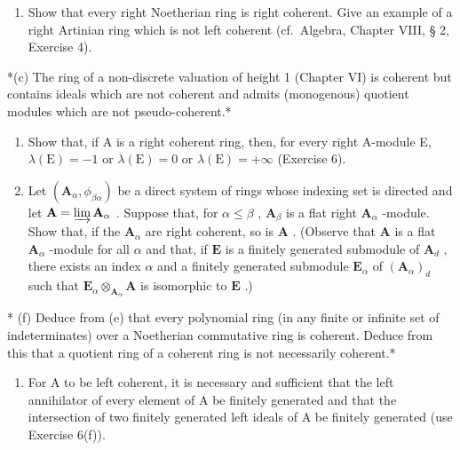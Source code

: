 \begin{enumerate}
\def\labelenumi{(\alph{enumi})}
\setcounter{enumi}{1}
\tightlist
\item
  Show that every right Noetherian ring is right coherent. Give an example of a right Artinian ring which is not left coherent (cf.~Algebra, Chapter VIII, § 2, Exercise 4).
\end{enumerate}

*(c) The ring of a non-discrete valuation of height 1 (Chapter VI) is coherent but contains ideals which are not coherent and admits (monogenous) quotient modules which are not pseudo-coherent.*

\begin{enumerate}
\def\labelenumi{(\alph{enumi})}
\setcounter{enumi}{3}
\item
  Show that, if A is a right coherent ring, then, for every right A-module E, \(\lambda(\mathrm{E}) = -1\) or \(\lambda(\mathrm{E}) = 0\) or \(\lambda(\mathrm{E}) = +\infty\) (Exercise 6).
\item
  Let \((\mathbf{A}_{\alpha}, \phi_{\beta \alpha})\) be a direct system of rings whose indexing set is directed and let \(\mathbf{A} = \varinjlim \mathbf{A}_{\alpha}\) . Suppose that, for \(\alpha \leqslant \beta\) , \(\mathbf{A}_{\beta}\) is a flat right \(\mathbf{A}_{\alpha}\) -module. Show that, if the \(\mathbf{A}_{\alpha}\) are right coherent, so is \(\mathbf{A}\) . (Observe that \(\mathbf{A}\) is a flat \(\mathbf{A}_{\alpha}\) -module for all \(\alpha\) and that, if \(\mathbf{E}\) is a finitely generated submodule of \(\mathbf{A}_d\) , there exists an index \(\alpha\) and a finitely generated submodule \(\mathbf{E}_{\alpha}\) of \((\mathbf{A}_{\alpha})_d\) such that \(\mathbf{E}_{\alpha} \otimes_{\mathbf{A}_{\alpha}} \mathbf{A}\) is isomorphic to \(\mathbf{E}\) .)
\end{enumerate}

* (f) Deduce from (e) that every polynomial ring (in any finite or infinite set of indeterminates) over a Noetherian commutative ring is coherent. Deduce from this that a quotient ring of a coherent ring is not necessarily coherent.*

\begin{enumerate}
\def\labelenumi{(\alph{enumi})}
\setcounter{enumi}{6}
\tightlist
\item
  For A to be left coherent, it is necessary and sufficient that the left annihilator of every element of A be finitely generated and that the intersection of two finitely generated left ideals of A be finitely generated (use Exercise 6(f)).
\end{enumerate}

